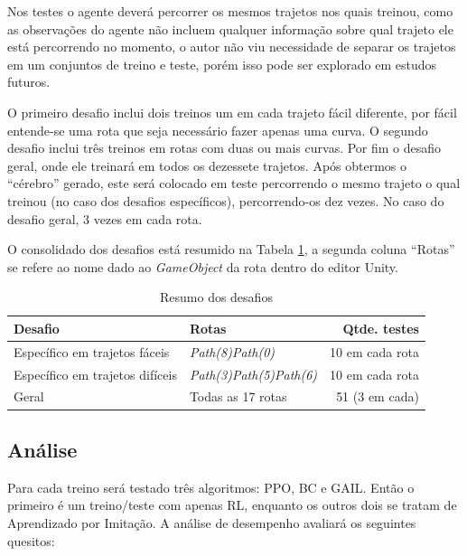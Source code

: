 Nos testes o agente deverá percorrer os mesmos trajetos nos quais treinou, como as observações do agente não incluem qualquer informação sobre qual trajeto ele está percorrendo no momento, o autor não viu necessidade de separar os trajetos em um conjuntos de treino e teste, porém isso pode ser explorado em estudos futuros. 

O primeiro desafio inclui dois treinos um em cada trajeto fácil diferente, por fácil entende-se uma rota que seja necessário fazer apenas uma curva. O segundo desafio inclui três treinos em rotas com duas ou mais curvas. Por fim o desafio geral, onde ele treinará em todos os dezessete trajetos. Após obtermos o ``cérebro'' gerado, este será colocado em teste percorrendo o mesmo trajeto o qual treinou (no caso dos desafios específicos), percorrendo-os dez vezes. No caso do desafio geral, 3 vezes em cada rota.

O consolidado dos desafios está resumido na Tabela \ref{tabela-testes}, a segunda coluna ``Rotas'' se refere ao nome dado ao \textit{GameObject} da rota dentro do editor Unity.

\begin{table}[htpb]
   \centering
   \caption{Resumo dos desafios}
   \label{tabela-testes}
   \begin{tabular}{|l|p{4cm}|r|}
        \hline
        \small{Desafio}                      & \small{Rotas}                                                         & \small{Qtde. testes}     \\ \hline
         Específico em trajetos fáceis       & \textit{Path(8)}\newline \textit{Path(0)}                             &      10 em cada rota     \\ \hline
         Específico em trajetos difíceis     & \textit{Path(3)}\newline \textit{Path(5)}\newline \textit{Path(6)}    &      10 em cada rota     \\ \hline
         Geral                               & Todas as 17 rotas                                                     &      51 (3 em cada)      \\ \hline
   \end{tabular}
\end{table}

\subsection{Análise}
Para cada treino será testado três algoritmos: PPO, BC e GAIL. Então o primeiro é um treino/teste com apenas RL, enquanto os outros dois se tratam de Aprendizado por Imitação. A análise de desempenho avaliará os seguintes quesitos:

